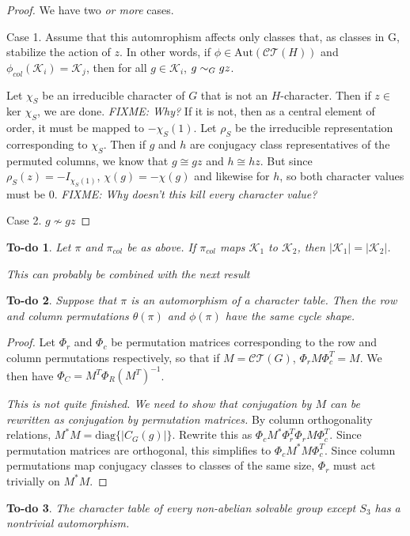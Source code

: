 \documentclass[12pt,letterpaper]{article}
\newtheorem{todo}{To-do}
\begin{document}
\begin{proof}
  We have two \emph{or more} cases.

   Case 1. Assume that this automrophism affects only classes that, as
   classes in G, stabilize the action of $z$. In other words, if
   $\phi\in\mathrm{Aut}(\mathcal{CT}(H))$ and
   $\phi_{col}(\mathcal{K}_i)=\mathcal{K}_j$, then for all
   $g\in\mathcal{K}_i$, $g\sim_{\tiny G} gz$.

   Let $\chi_S$ be an irreducible character of $G$ that is not an
   $H$-character. Then if $z\in$ ker $\chi_S$, we are
   done. \emph{FIXME: Why?} If it is not, then as a central element of
   order, it must be mapped to $-\chi_S(1)$. Let $\rho_S$ be the
   irreducible representation corresponding to $\chi_S$. Then if $g$
   and $h$ are conjugacy class representatives of the permuted
   columns, we know that $g\cong gz$ and $h\cong hz$. But since
   $\rho_S(z)=-I_{\chi_S(1)}$, $\chi(g)=-\chi(g)$ and likewise for
   $h$, so both character values must be 0. \emph{FIXME: Why doesn't
     this kill every character value?}

   Case 2. $g\nsim gz$
\end{proof}

\begin{todo}
  Let $\pi$ and $\pi_{col}$ be as above. If
  $\pi_{col}$ maps $\mathcal{K}_1$ to $\mathcal{K}_2$, then $|\mathcal{K}_1|=|\mathcal{K}_2|$.
\end{todo}

\emph{This can probably be combined with the next result}

\begin{todo}
  Suppose that $\pi$ is an automorphism of a character table. Then the
  row and column permutations $\theta(\pi)$ and $\phi(\pi)$ have the
  same cycle shape.
\end{todo}

\begin{proof}
  Let $\Phi_r$ and $\Phi_c$ be permutation matrices corresponding to
  the row and column permutations respectively, so that if
  $M=\mathcal{CT}(G)$, $\Phi_r M \Phi_c^T=M$. We then have $\Phi_C=M^T\Phi_R(M^T)^{-1}$.

  \emph{This is not quite finished. We need to show that conjugation
    by $M$ can be rewritten as conjugation by permutation matrices.}
  By column orthogonality relations,
  $M^*M=\mathrm{diag}\{|C_G(g)|\}$. Rewrite this as
  $\Phi_c M^* \Phi_r^T \Phi_r M \Phi_c^T $. Since permutation matrices
  are orthogonal, this simplifies to $\Phi_c M^* M \Phi_c^T$. Since
  column permutations map conjugacy classes to classes of the same
  size, $\Phi_r$ must act trivially on $M^*M$.
\end{proof}

\begin{todo}
  The character table of every non-abelian solvable group except $S_3$
  has a nontrivial automorphism.
\end{todo}
\end{document}
